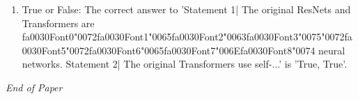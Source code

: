 \documentclass[12pt]{article}
\begin{document}
\begin{enumerate}[label=\arabic*.]
\item True or False: The correct answer to 'Statement 1| The original ResNets and Transformers are {\csname fa0030Font0\endcsname\char"0072}{\csname fa0030Font1\endcsname\char"0065}{\csname fa0030Font2\endcsname\char"0063}{\csname fa0030Font3\endcsname\char"0075}{\char"0072}{\csname fa0030Font5\endcsname\char"0072}{\csname fa0030Font6\endcsname\char"0065}{\csname fa0030Font7\endcsname\char"006E}{\csname fa0030Font8\endcsname\char"0074} neural networks. Statement 2| The original Transformers use self-...' is 'True, True'.
\end{enumerate}

\vfill
\noindent\textit{End of Paper}
\end{document}
